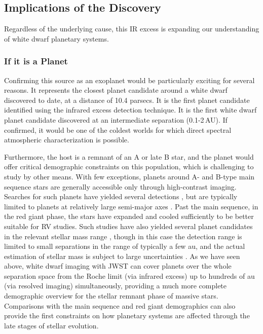 \documentclass[twocolumn]{aastex631}
\begin{document}
\subsection{Implications of the Discovery} 

Regardless of the underlying cause, this IR excess is expanding our understanding of white dwarf planetary systems.

\subsubsection{If it is a Planet} 
Confirming this source as an exoplanet would be particularly exciting for several reasons. It represents the closest planet candidate around a white dwarf discovered to date, at a distance of 10.4 parsecs. It is the first planet candidate identified using the infrared excess detection technique. It is the first white dwarf planet candidate discovered at an intermediate separation (0.1-2\,AU). If confirmed, it would be one of the coldest worlds for which direct spectral atmospheric characterization is possible.

Furthermore, the host is a remnant of an A or late B star, and the planet would offer critical demographic constraints on this population, which is challenging to study by other means. With few exceptions, planets around A- and B-type main sequence stars are generally accessible only through high-contrast imaging. Searches for such planets have yielded several detections \citep[e.g.][]{Lagrange2010,Janson2021bcen}, but are typically limited to planets at relatively large semi-major axes \citep[tens or hundreds of au;][]{Nielsen2019,Vigan2021,2021A&A...646A.164J}. Past the main sequence, in the red giant phase, the stars have expanded and cooled sufficiently to be better suitable for RV studies. Such studies have also yielded several planet candidates in the relevant stellar mass range \citep[e.g.][]{Johnson2007,Reffert2015}, though in this case the detection range is limited to small separations in the range of typically a few au, and the actual estimation of stellar mass is subject to large uncertainties \citep[e.g.][]{Lloyd2011,Johnson2013}. As we have seen above, white dwarf imaging with JWST can cover planets over the whole separation space from the Roche limit (via infrared excess) up to hundreds of au (via resolved imaging) simultaneously, providing a much more complete demographic overview for the stellar remnant phase of massive stars. Comparisons with the main sequence and red giant demographics can also provide the first constraints on how planetary systems are affected through the late stages of stellar evolution.
\end{document}
